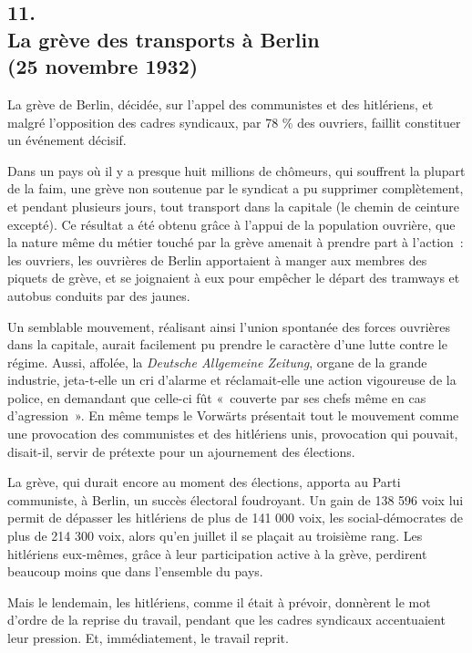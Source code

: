 \documentclass[french,twoside]{book} %
\begin{document}
\subsection[{11. La grève des transports à Berlin, (25 novembre 1932)}]{11. \\
La grève des transports à Berlin \\
(25 novembre 1932)}
\noindent \par
La grève de Berlin, décidée, sur l'appel des communistes et des hitlériens, et malgré l'opposition des cadres syndicaux, par 78 \% des ouvriers, faillit constituer un événement décisif.\par
Dans un pays où il y a presque huit millions de chômeurs, qui souffrent la plupart de la faim, une grève non soutenue par le syndicat a pu supprimer complètement, et pendant plusieurs jours, tout transport dans la capitale (le chemin de ceinture excepté). Ce résultat a été obtenu grâce à l'appui de la population ouvrière, que la nature même du métier touché par la grève amenait à prendre part à l'action : les ouvriers, les ouvrières de Berlin appor­taient à manger aux membres des piquets de grève, et se joignaient à eux pour empêcher le départ des tramways et autobus conduits par des jaunes.\par
Un semblable mouvement, réalisant ainsi l'union spontanée des forces ouvrières dans la capitale, aurait facilement pu prendre le caractère d'une lutte contre le régime. Aussi, affolée, la {\itshape Deutsche Allgemeine Zeitung}, organe de la grande industrie, jeta-t-elle un cri d'alarme et réclamait-elle une action vigou­reuse de la police, en demandant que celle-ci fût « couverte par ses chefs même en cas d'agression ». En même temps le Vorwärts présentait tout le mouvement comme une provocation des communistes et des hitlériens unis, provocation qui pouvait, disait-il, servir de prétexte pour un ajournement des élections.\par
La grève, qui durait encore au moment des élections, apporta au Parti communiste, à Berlin, un succès électoral foudroyant. Un gain de 138 596 voix lui permit de dépasser les hitlériens de plus de 141 000 voix, les social-démocrates de plus de 214 300 voix, alors qu'en juillet il se plaçait au troisième rang. Les hitlériens eux-mêmes, grâce à leur participation active à la grève, perdirent beaucoup moins que dans l'ensemble du pays.\par
Mais le lendemain, les hitlériens, comme il était à prévoir, donnèrent le mot d'ordre de la reprise du travail, pendant que les cadres syndicaux accen­tuaient leur pression. Et, immédiatement, le travail reprit.\par
\end{document}

